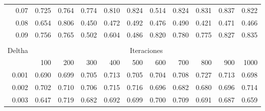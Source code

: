 \begin{table}[H]
\begin{tabular}{rrrrrrrrrrr}
0.07                       & 0.725                & 0.764                & 0.774                & 0.810                & 0.824                & 0.514                & 0.824                & 0.831                & 0.837                & 0.822                \\
0.08                       & 0.654                & 0.806                & 0.450                & 0.472                & 0.492                & 0.476                & 0.490                & 0.421                & 0.471                & 0.466                \\
0.09                       & 0.756                & 0.765                & 0.502                & 0.604                & 0.486                & 0.820                & 0.780                & 0.775                & 0.827                & 0.835                \\
\multicolumn{1}{l}{}       & \multicolumn{1}{l}{} & \multicolumn{1}{l}{} & \multicolumn{1}{l}{} & \multicolumn{1}{l}{} & \multicolumn{1}{l}{} & \multicolumn{1}{l}{} & \multicolumn{1}{l}{} & \multicolumn{1}{l}{} & \multicolumn{1}{l}{} & \multicolumn{1}{l}{} \\
\multicolumn{1}{l}{Deltha} & \multicolumn{10}{c}{Iteraciones}                                                                                                                                                                                                    \\
\multicolumn{1}{l}{}       & 100                  & 200                  & 300                  & 400                  & 500                  & 600                  & 700                  & 800                  & 900                  & 1000                 \\
0.001                      & 0.690                & 0.699                & 0.705                & 0.713                & 0.705                & 0.704                & 0.708                & 0.727                & 0.713                & 0.698                \\
0.002                      & 0.702                & 0.710                & 0.706                & 0.715                & 0.716                & 0.696                & 0.682                & 0.680                & 0.696                & 0.714                \\
0.003                      & 0.647                & 0.719                & 0.682                & 0.692                & 0.699                & 0.700                & 0.709                & 0.691                & 0.687                & 0.659                \\

\end{tabular}
\end{table}
